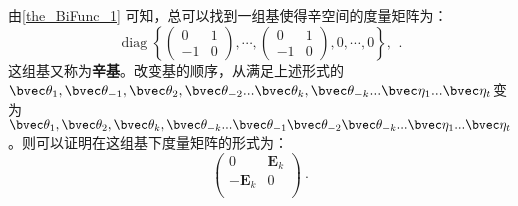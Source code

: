 由\autoref{the_BiFunc_1} 可知，总可以找到一组基使得辛空间的度量矩阵为：
\begin{equation}
\operatorname{diag}\left\{\left(\begin{array}{rr}
0 & 1 \\
-1 & 0
\end{array}\right), \cdots,\left(\begin{array}{rr}
0 & 1 \\
-1 & 0
\end{array}\right), 0, \cdots, 0\right\} \text {, }
~.\end{equation}
这组基又称为\textbf{辛基}。改变基的顺序，从满足上述形式的${\bvec \theta_1,\bvec\theta_{-1},\bvec\theta_2,\bvec\theta_{-2}...\bvec \theta_k,\bvec\theta_{-k}...\bvec\eta_1...\bvec\eta_t}$变为${\bvec \theta_1,\bvec\theta_2,\bvec \theta_k,\bvec\theta_{-k}...\bvec\theta_{-1}\bvec\theta_{-2}\bvec\theta_{-k}...\bvec\eta_1...\bvec\eta_t}$。则可以证明在这组基下度量矩阵的形式为：
\begin{equation}
\begin{pmatrix}
 0 & \boldsymbol E_k \\
  -\boldsymbol E_k&  0\\
\end{pmatrix}~.
\end{equation}